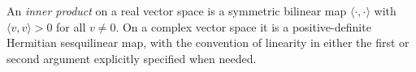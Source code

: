 
An \emph{inner product} on a real vector space is a symmetric bilinear map $\langle\cdot,\cdot\rangle$ with $\langle v,v\rangle>0$ for all $v\ne0$. On a complex vector space it is a positive-definite Hermitian sesquilinear map, with the convention of linearity in either the first or second argument explicitly specified when needed.
